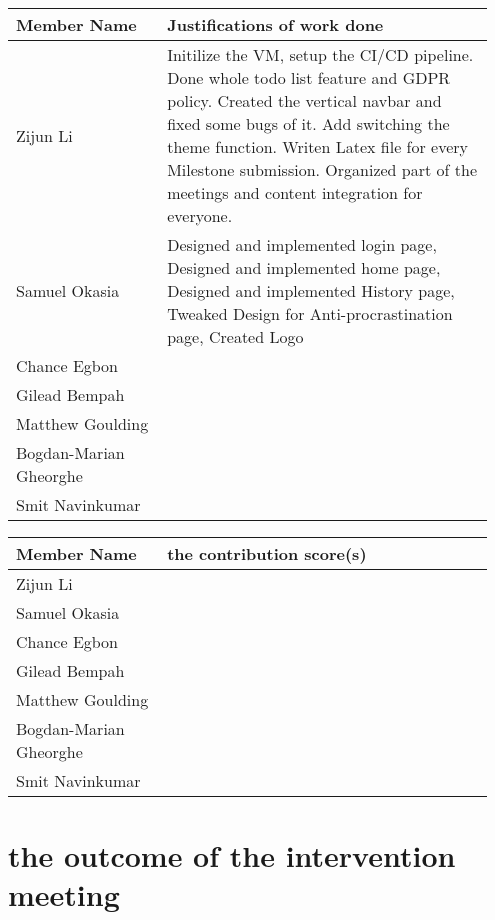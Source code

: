 \documentclass[a4paper]{article}
\begin{document}
{\noindent\begin{tabular}{|p{0.3\linewidth}|p{0.65\linewidth}|} 
	\hline
 \textbf{Member Name} & \textbf{Justifications of work done} \\
 \hline
 Zijun Li & Initilize the VM, setup the CI/CD pipeline. Done whole todo list feature and GDPR policy. Created the vertical navbar and fixed some bugs of it. Add switching the theme function. Writen Latex file for every Milestone submission. Organized part of the meetings and content integration for everyone. \\
 \hline
 Samuel Okasia & Designed and implemented login page, Designed and implemented home page, Designed and implemented History page, Tweaked Design for Anti-procrastination page, Created Logo\\
 \hline
 Chance Egbon & \\
 \hline
 Gilead Bempah & \\
 \hline
 Matthew Goulding& \\
 \hline
 Bogdan-Marian Gheorghe & \\
 \hline
 Smit Navinkumar& \\
 \hline
\end{tabular}}

{\noindent\begin{tabular}{|p{0.3\linewidth}|p{0.65\linewidth}|} 
	\hline
 \textbf{Member Name} & \textbf{ the contribution score(s) } \\
 \hline
 Zijun Li & \\
 \hline
 Samuel Okasia & \\
 \hline
 Chance Egbon & \\
 \hline
 Gilead Bempah & \\
 \hline
 Matthew Goulding& \\
 \hline
 Bogdan-Marian Gheorghe & \\
 \hline
 Smit Navinkumar& \\
 \hline
\end{tabular}}

\section*{the outcome of the intervention meeting}
\end{document}

